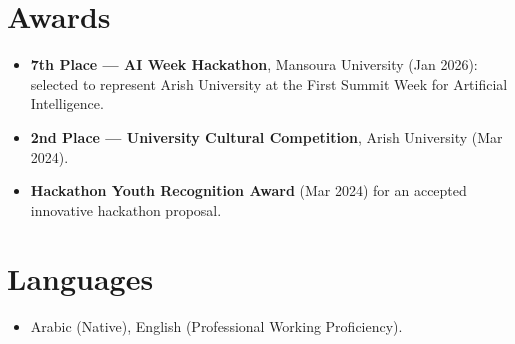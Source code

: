 \documentclass{resume}
\begin{document}
\section{Awards}
\begin{itemize}
  \item \textbf{7th Place --- AI Week Hackathon}, Mansoura University (Jan 2026): selected to represent Arish University at the First Summit Week for Artificial Intelligence.
  \item \textbf{2nd Place --- University Cultural Competition}, Arish University (Mar 2024).
  \item \textbf{Hackathon Youth Recognition Award} (Mar 2024) for an accepted innovative hackathon proposal.
\end{itemize}

\section{Languages}
\begin{itemize}
  \item Arabic (Native), English (Professional Working Proficiency).
\end{itemize}
\end{document}
